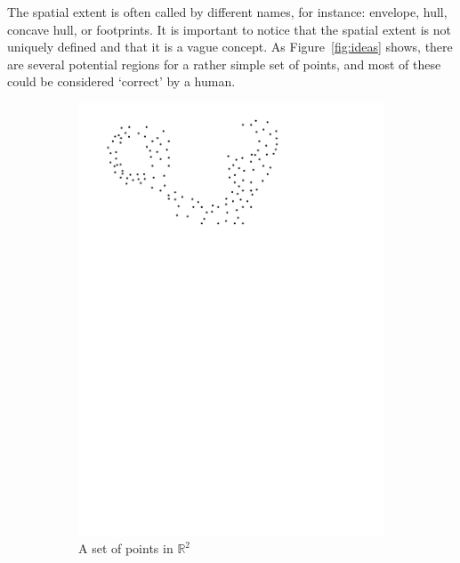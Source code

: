 The spatial extent is often called by different names, for instance: envelope, hull, concave hull, or footprints.
It is important to notice that the spatial extent is not uniquely defined and that it is a vague concept.
As Figure~\ref{fig:ideas} shows, there are several potential regions for a rather simple set of points, and most of these could be considered `correct' by a human.
\begin{figure}
  \centering
  \begin{subfigure}[b]{0.21\linewidth}
    \centering
    \includegraphics[page=1,width=\textwidth]{figs/idea.pdf}
    \caption{A set of points in $\mathbb{R}^2$}
    \label{fig:ideas:a}
  \end{subfigure}%
  \qquad
  \begin{subfigure}[b]{0.21\linewidth}
    \centering

\end{subfigure}
\end{figure}

